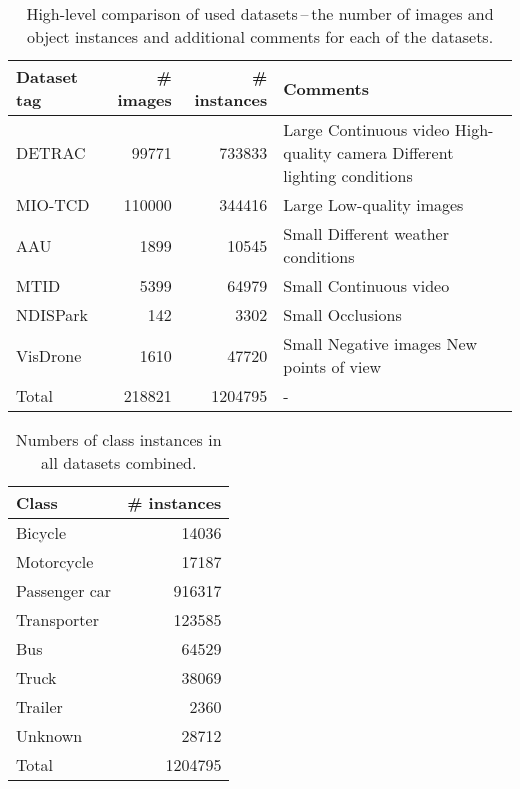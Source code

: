 \begin{table}[h]
\centering
\begin{tabular}{|l|rr|p{5cm}|}
    \hline
    Dataset tag & \# images & \# instances & Comments \\
    \hline
    DETRAC      &  \num{99771}  & \num{733833} & Large \newline Continuous video \newline High-quality camera \newline Different lighting conditions \\
    \hline
    MIO-TCD     &  \num{110000} & \num{344416} & Large \newline Low-quality images \\
    \hline
    AAU         &    \num{1899} &  \num{10545} & Small \newline Different weather conditions \\
    \hline
    MTID        &    \num{5399} &  \num{64979} & Small \newline Continuous video \\
    \hline
    NDISPark    &     \num{142} &   \num{3302} & Small \newline Occlusions \\
    \hline
    VisDrone    &    \num{1610} &  \num{47720} & Small \newline Negative images \newline New points of view \\
    \hline
    \hline
    Total       &  \num{218821} & \num{1204795} & - \\
    \hline
\end{tabular}
\caption{High-level comparison of used datasets\,--\,the number of images and object instances and additional comments for each of the datasets.}
\label{DatasetsSummary}
\end{table}

\begin{table}[h]
\centering
\begin{tabular}{|l|r|}
    \hline
    Class         & \# instances \\
    \hline
    Bicycle       &  \num{14036} \\
    Motorcycle    &  \num{17187} \\
    Passenger car & \num{916317} \\
    Transporter   & \num{123585} \\
    Bus           &  \num{64529} \\
    Truck         &  \num{38069} \\
    Trailer       &   \num{2360} \\
    Unknown       &  \num{28712} \\
    \hline
    \hline
    Total         & \num{1204795} \\
    \hline
\end{tabular}
\caption{Numbers of class instances in all datasets combined.}
\label{DatasetsCounts}
\end{table}


